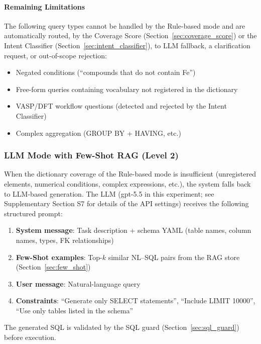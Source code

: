 \documentclass[5p,twocolumn]{elsarticle}
\begin{document}
\paragraph{Remaining Limitations}
The following query types cannot be handled by the Rule-based mode and are automatically routed,
by the Coverage Score (Section~\ref{sec:coverage_score}) or the Intent Classifier
(Section~\ref{sec:intent_classifier}), to
LLM fallback, a clarification request, or out-of-scope rejection:

\begin{itemize}
  \item Negated conditions (``compounds that do not contain Fe'')
  \item Free-form queries containing vocabulary not registered in the dictionary
  \item VASP/DFT workflow questions (detected and rejected by the Intent Classifier)
  \item Complex aggregation (GROUP BY + HAVING, etc.)
\end{itemize}

\subsubsection{LLM Mode with Few-Shot RAG (Level 2)}
\label{sec:llm_mode}

When the dictionary coverage of the Rule-based mode is insufficient
(unregistered elements, numerical conditions, complex expressions, etc.),
the system falls back to LLM-based generation.
The LLM (gpt-5.5 in this experiment; see Supplementary Section S7 for details of the API settings)
receives the following structured prompt:

\begin{enumerate}
  \item \textbf{System message}: Task description + schema YAML (table names, column names, types, FK relationships)
  \item \textbf{Few-Shot examples}: Top-$k$ similar NL--SQL pairs from the RAG store (Section~\ref{sec:few_shot})
  \item \textbf{User message}: Natural-language query
  \item \textbf{Constraints}: ``Generate only SELECT statements'', ``Include LIMIT 10000'',
        ``Use only tables listed in the schema''
\end{enumerate}

The generated SQL is validated by the SQL guard (Section~\ref{sec:sql_guard}) before execution.
\end{document}
